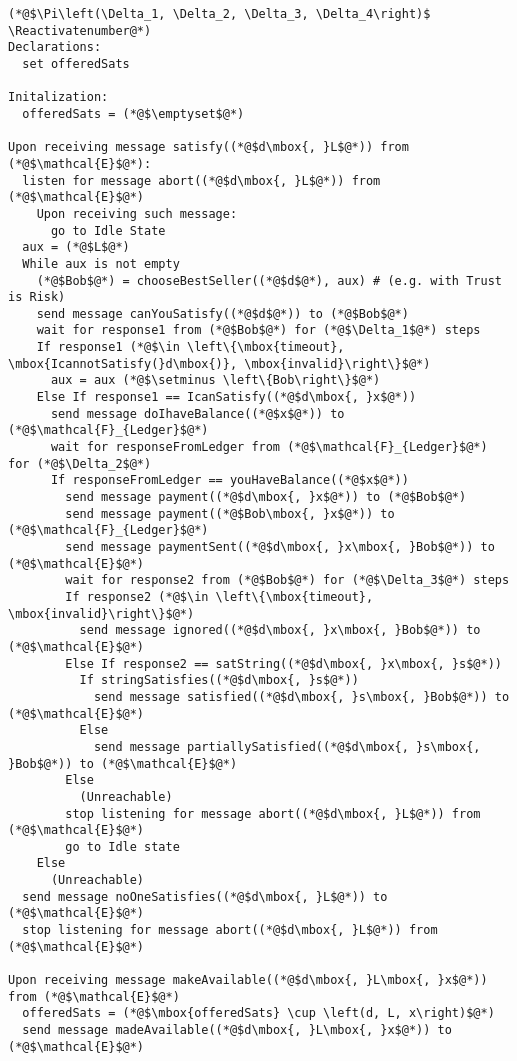 \Suppressnumber
\begin{lstlisting}[label=protocol, style=numbers]
(*@$\Pi\left(\Delta_1, \Delta_2, \Delta_3, \Delta_4\right)$ \Reactivatenumber@*)
Declarations:
  set offeredSats

Initalization:
  offeredSats = (*@$\emptyset$@*)

Upon receiving message satisfy((*@$d\mbox{, }L$@*)) from (*@$\mathcal{E}$@*):
  listen for message abort((*@$d\mbox{, }L$@*)) from (*@$\mathcal{E}$@*)
    Upon receiving such message:
      go to Idle State
  aux = (*@$L$@*)
  While aux is not empty
    (*@$Bob$@*) = chooseBestSeller((*@$d$@*), aux) # (e.g. with Trust is Risk)
    send message canYouSatisfy((*@$d$@*)) to (*@$Bob$@*)
    wait for response1 from (*@$Bob$@*) for (*@$\Delta_1$@*) steps
    If response1 (*@$\in \left\{\mbox{timeout}, \mbox{IcannotSatisfy(}d\mbox{)}, \mbox{invalid}\right\}$@*)
      aux = aux (*@$\setminus \left\{Bob\right\}$@*)
    Else If response1 == IcanSatisfy((*@$d\mbox{, }x$@*))
      send message doIhaveBalance((*@$x$@*)) to (*@$\mathcal{F}_{Ledger}$@*)
      wait for responseFromLedger from (*@$\mathcal{F}_{Ledger}$@*) for (*@$\Delta_2$@*)
      If responseFromLedger == youHaveBalance((*@$x$@*))
        send message payment((*@$d\mbox{, }x$@*)) to (*@$Bob$@*)
        send message payment((*@$Bob\mbox{, }x$@*)) to (*@$\mathcal{F}_{Ledger}$@*)
        send message paymentSent((*@$d\mbox{, }x\mbox{, }Bob$@*)) to (*@$\mathcal{E}$@*)
        wait for response2 from (*@$Bob$@*) for (*@$\Delta_3$@*) steps
        If response2 (*@$\in \left\{\mbox{timeout}, \mbox{invalid}\right\}$@*)
          send message ignored((*@$d\mbox{, }x\mbox{, }Bob$@*)) to (*@$\mathcal{E}$@*)
        Else If response2 == satString((*@$d\mbox{, }x\mbox{, }s$@*))
          If stringSatisfies((*@$d\mbox{, }s$@*))
            send message satisfied((*@$d\mbox{, }s\mbox{, }Bob$@*)) to (*@$\mathcal{E}$@*)
          Else
            send message partiallySatisfied((*@$d\mbox{, }s\mbox{, }Bob$@*)) to (*@$\mathcal{E}$@*)
        Else
          (Unreachable)
        stop listening for message abort((*@$d\mbox{, }L$@*)) from (*@$\mathcal{E}$@*)
        go to Idle state
    Else
      (Unreachable)
  send message noOneSatisfies((*@$d\mbox{, }L$@*)) to (*@$\mathcal{E}$@*)
  stop listening for message abort((*@$d\mbox{, }L$@*)) from (*@$\mathcal{E}$@*)

Upon receiving message makeAvailable((*@$d\mbox{, }L\mbox{, }x$@*)) from (*@$\mathcal{E}$@*)
  offeredSats = (*@$\mbox{offeredSats} \cup \left(d, L, x\right)$@*)
  send message madeAvailable((*@$d\mbox{, }L\mbox{, }x$@*)) to (*@$\mathcal{E}$@*)


\end{lstlisting}
